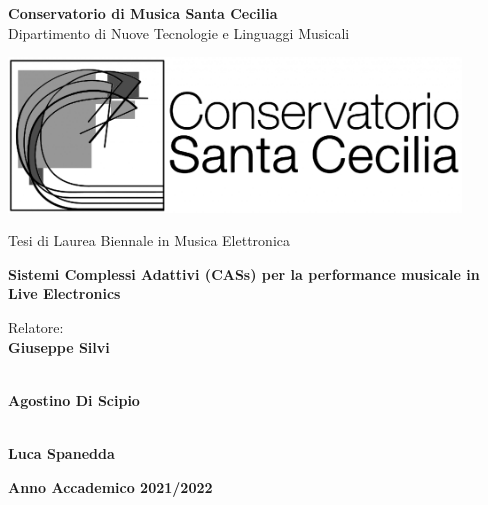 \begin{center}
{\LARGE \textbf{Conservatorio di Musica Santa Cecilia}} \\
\vspace{0.2cm}
{\Large {Dipartimento di Nuove Tecnologie e Linguaggi
Musicali}} \\ 
\vspace{1cm}

\includegraphics[width=12cm]{figures/logo-santacecilia-2-1024x351-1024x351.png} \\
\vspace{0.8cm}

{\Large {Tesi di Laurea Biennale in Musica Elettronica}} \\
\vspace{1cm}

{\LARGE \textbf{Sistemi Complessi Adattivi (CASs) per la performance musicale in Live Electronics}} \\ 
\vspace{1cm}

\end{center}

\begin{multicols}{2}
\noindent \large{Relatore:} \\
\large{\textbf{Giuseppe Silvi}} \\
\vspace{0.1cm}

 \\
\large{\textbf{Agostino Di Scipio}} \\
\vspace{0.1cm}

\columnbreak

 \\
\large{\textbf{Luca Spanedda}} \\
\end{multicols}
\vspace{2cm}

\begin{center}
    \large{\textbf{Anno Accademico 2021/2022}}
\end{center}